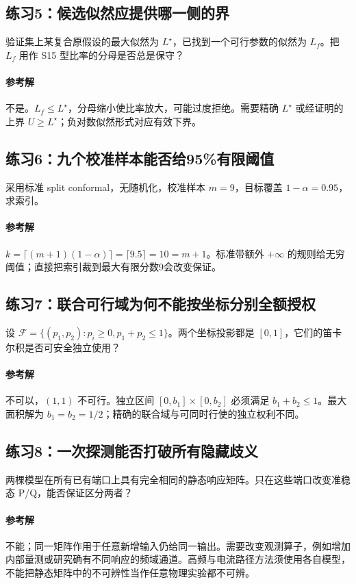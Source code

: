 \documentclass[UTF8,11pt,fontset=fandol,openany,oneside]{ctexbook}
\theoremstyle{definition}
\theoremstyle{remark}
\numberwithin{equation}{chapter}
\begin{document}
\subsection{练习5：候选似然应提供哪一侧的界}
验证集上某复合原假设的最大似然为 $L^\star$，已找到一个可行参数的似然为 $L_f$。把 $L_f$ 用作 S15 型比率的分母是否总是保守？
\paragraph{参考解}不是。$L_f\leq L^\star$，分母缩小使比率放大，可能过度拒绝。需要精确 $L^\star$ 或经证明的上界 $U\geq L^\star$；负对数似然形式对应有效下界。

\subsection{练习6：九个校准样本能否给95\%有限阈值}
采用标准 split conformal，无随机化，校准样本 $m=9$，目标覆盖 $1-\alpha=0.95$，求索引。
\paragraph{参考解} $k=\lceil(m+1)(1-\alpha)\rceil=\lceil9.5\rceil=10=m+1$。标准带额外 $+\infty$ 的规则给无穷阈值；直接把索引裁到最大有限分数9会改变保证。

\subsection{练习7：联合可行域为何不能按坐标分别全额授权}
设 $\mathcal F=\{(p_1,p_2):p_i\geq0,p_1+p_2\leq1\}$。两个坐标投影都是 $[0,1]$，它们的笛卡尔积是否可安全独立使用？
\paragraph{参考解}不可以，$(1,1)$ 不可行。独立区间 $[0,b_1]\times[0,b_2]$ 必须满足 $b_1+b_2\leq1$。最大面积解为 $b_1=b_2=1/2$；精确的联合域与可同时行使的独立权利不同。

\subsection{练习8：一次探测能否打破所有隐藏歧义}
两棵模型在所有已有端口上具有完全相同的静态响应矩阵。只在这些端口改变准稳态 P/Q，能否保证区分两者？
\paragraph{参考解}不能；同一矩阵作用于任意新增输入仍给同一输出。需要改变观测算子，例如增加内部量测或研究确有不同响应的频域通道。高频与电流路径方法须使用各自模型，不能把静态矩阵中的不可辨性当作任意物理实验都不可辨。
\end{document}
